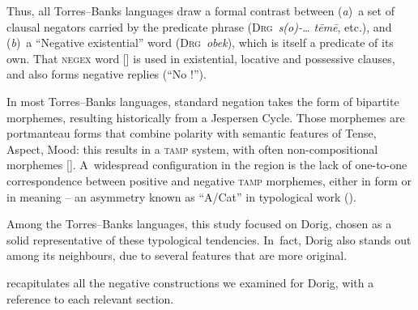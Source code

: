 \documentclass[output=paper,colorlinks,citecolor=brown,draft]{langscibook}
\begin{document}
Thus, all Torres–Banks languages draw a formal contrast between (\textit{a})~a set of clausal negators carried by the predicate phrase (\textsc{Drg}~\textit{s(o)-… tēmē}, etc.), and (\textit{b})~a “Negative existential” word (\textsc{Drg}~\textit{obek}), which is itself a predicate of its own. That \textsc{negex} word [] is used in existential, locative and possessive clauses, and also forms negative replies (“No !”).


In most Torres–Banks languages, standard negation takes the form of bipartite morphemes, resulting historically from a Jespersen Cycle. Those morphemes are portmanteau forms that combine polarity with semantic features of Tense, Aspect, Mood: this results in a \textsc{tamp} system, with often non-compositional morphemes []. A~widespread configuration in the region is the lack of one-to-one correspondence between positive and negative \textsc{tamp} morphemes, either in form or in meaning – an asymmetry known as “A/Cat” in typological work (\citealt{Miestamo2005,Miestamo2013-wals114}). 

Among the Torres–Banks languages, this study focused on Dorig, chosen as a solid representative of these typological tendencies. In~fact, Dorig also stands out among its neighbours, due to several features that are more original.

 recapitulates all the negative constructions we examined for Dorig, with a reference to each relevant section.


\end{document}
